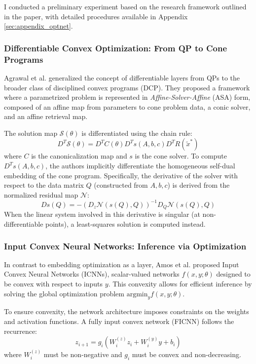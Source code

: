 \documentclass{article}
\begin{document}
I conducted a preliminary experiment based on the research framework outlined in the paper, with detailed procedures available in Appendix \ref{sec:appendix_optnet}.

\subsubsection{Differentiable Convex Optimization: From QP to Cone Programs}

Agrawal et al. \cite{agrawal2019differentiable} generalized the concept of differentiable layers from QPs to the broader class of disciplined convex programs (DCP). They proposed a framework where a parametrized problem is represented in \textit{Affine-Solver-Affine} (ASA) form, composed of an affine map from parameters to cone problem data, a conic solver, and an affine retrieval map.

The solution map $\mathcal{S}(\theta)$ is differentiated using the chain rule:
\begin{equation}
  D^T \mathcal{S}(\theta) = D^T C(\theta) D^T s(A, b, c) D^T R(\tilde{x}^*)
\end{equation}
where $C$ is the canonicalization map and $s$ is the cone solver. To compute $D^T s(A, b, c)$, the authors implicitly differentiate the homogeneous self-dual embedding of the cone program. Specifically, the derivative of the solver with respect to the data matrix $Q$ (constructed from $A, b, c$) is derived from the normalized residual map $\mathcal{N}$:
\begin{equation}
  Ds(Q) = -(D_z \mathcal{N}(s(Q), Q))^{-1} D_Q \mathcal{N}(s(Q), Q)
\end{equation}
When the linear system involved in this derivative is singular (at non-differentiable points), a least-squares solution is computed instead.

\subsubsection{Input Convex Neural Networks: Inference via Optimization}

In contrast to embedding optimization as a layer, Amos et al. \cite{amos2017icnn} proposed Input Convex Neural Networks (ICNNs), scalar-valued networks $f(x, y; \theta)$ designed to be convex with respect to inputs $y$. This convexity allows for efficient inference by solving the global optimization problem $\text{argmin}_y f(x, y; \theta)$.

To ensure convexity, the network architecture imposes constraints on the weights and activation functions. A fully input convex network (FICNN) follows the recurrence:
\begin{equation}
  z_{i+1} = g_i \left( W_i^{(z)} z_i + W_i^{(y)} y + b_i \right)
\end{equation}
where $W_i^{(z)}$ must be non-negative and $g_i$ must be convex and non-decreasing.
\end{document}

